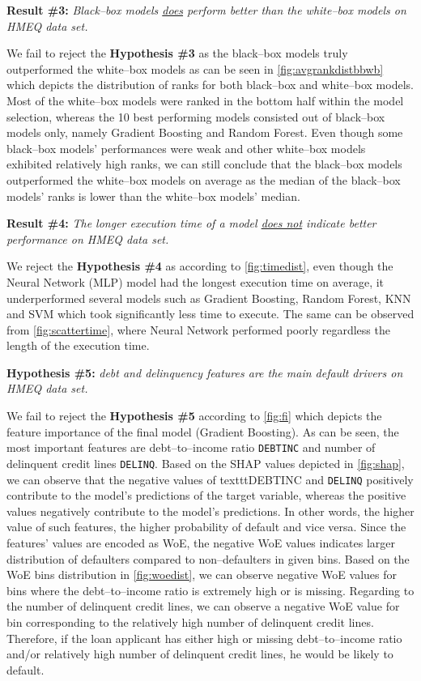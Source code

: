 \vspace{0.3cm}

\noindent \textbf{Result \#3:} \textit{Black--box models \underline{does} perform better than the white--box models on HMEQ data set.}

We fail to reject the \textbf{Hypothesis \#3} as the black--box models truly outperformed the white--box models as can be seen in \autoref{fig:avgrankdistbbwb} which depicts the distribution of ranks for both black--box and white--box models.
Most of the white--box models were ranked in the bottom half within the model selection, whereas the 10 best performing models consisted out of black--box models only, namely Gradient Boosting and Random Forest.
Even though some black--box models' performances were weak and other white--box models exhibited relatively high ranks, we can still conclude that the black--box models outperformed the white--box models on average as the median of the black--box models' ranks is lower than the white--box models' median.
\vspace{0.3cm}

\noindent \textbf{Result \#4:} \textit{The longer execution time of a model \underline{does not} indicate better performance on HMEQ data set.}

We reject the \textbf{Hypothesis \#4} as according to \autoref{fig:timedist}, even though the Neural Network (MLP) model had the longest execution time on average, it underperformed several models such as Gradient Boosting, Random Forest, KNN and SVM which took significantly less time to execute. The same can be observed from \autoref{fig:scattertime}, where Neural Network performed poorly regardless the length of the execution time.
\vspace{0.3cm}

\noindent \textbf{Hypothesis \#5:} \textit{ debt and delinquency features are the main default drivers on HMEQ data set.}

We fail to reject the \textbf{Hypothesis \#5} according to \autoref{fig:fi} which depicts the feature importance of the final model (Gradient Boosting). As can be seen, the most important features are debt--to--income ratio \texttt{DEBTINC} and number of delinquent credit lines \texttt{DELINQ}.
Based on the SHAP values depicted in \autoref{fig:shap}, we can observe that the negative values of texttt{DEBTINC} and \texttt{DELINQ} positively contribute to the model's predictions of the target variable, whereas the positive values negatively contribute to the model's predictions.
In other words, the higher value of such features, the higher probability of default and vice versa.
Since the features' values are encoded as WoE, the negative WoE values indicates larger distribution of defaulters compared to non--defaulters in given bins.
Based on the WoE bins distribution in \autoref{fig:woedist}, we can observe negative WoE values for bins where the debt--to--income ratio is extremely high or is missing. Regarding to the number of delinquent credit lines, we can observe a negative WoE value for bin corresponding to the relatively high number of delinquent credit lines.
Therefore, if the loan applicant has either high or missing debt--to--income ratio and/or relatively high number of delinquent credit lines,  he would be likely to default.